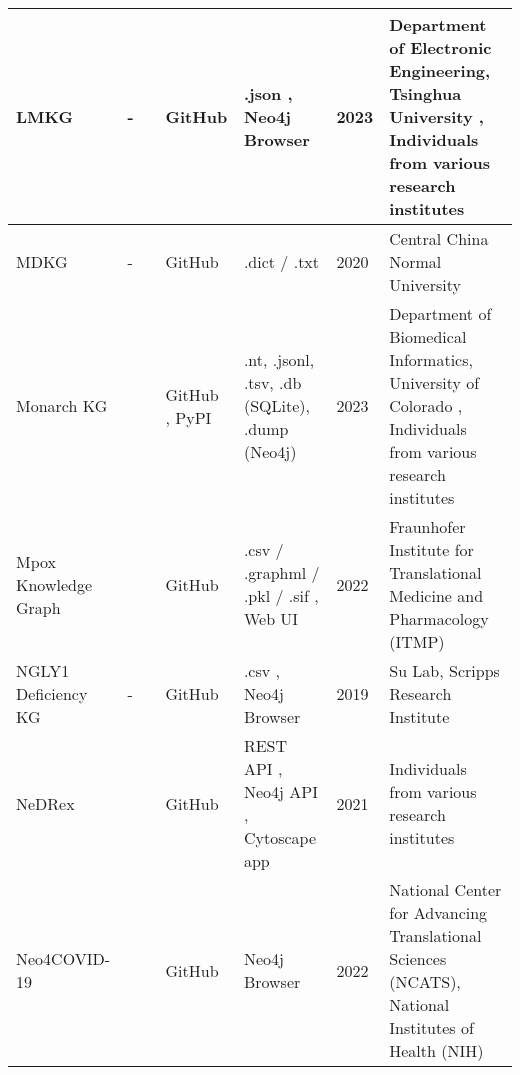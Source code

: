 \documentclass{article}
\begin{document}
\begin{landscape}
\begin{xltabular}{\textwidth}{p{3cm}|p{2.2cm}|p{2.2cm}|p{2.2cm}|p{2.2cm}|p{1cm}|p{6cm}}
\hline


LMKG
&
-
&
\cite{lmkg_publication}
&
GitHub
\cite{lmkg_github}
&
.json
\cite{lmkg_data1},
Neo4j Browser
\cite{lmkg_data2}
&
2023
&
Department of Electronic Engineering, Tsinghua University
\cite{lmkg_group},
Individuals from various research institutes
\\


\hline


MDKG
&
-
&
\cite{mdkg_publication}
&
GitHub
\cite{mdkg_github}
&
.dict / .txt
\cite{mdkg_data}
&
2020
&
Central China Normal University
\cite{mdkg_group}
\\


\hline


Monarch KG
&
\cite{monarchkg_website1}
\cite{monarchkg_website2}
&
\cite{monarchkg_publication1}
\cite{monarchkg_publication2}
\cite{monarchkg_publication3}
&
GitHub
\cite{monarchkg_github1}
\cite{monarchkg_github2},
PyPI
\cite{monarchkg_pypi}
&
.nt, .jsonl, .tsv, .db (SQLite), .dump (Neo4j)
\cite{monarchkg_data}
&
2023
&
Department of Biomedical Informatics, University of Colorado
\cite{monarchkg_group},
Individuals from various research institutes
\\


\hline


Mpox Knowledge Graph
&
\cite{mpoxkg_website}
&
\cite{mpoxkg_publication}
&
GitHub
\cite{mpoxkg_github}
&
.csv / .graphml / .pkl / .sif
\cite{mpoxkg_data1}
\cite{mpoxkg_data2},
Web UI
\cite{mpoxkg_data3}
&
2022
&
Fraunhofer Institute for Translational Medicine and Pharmacology (ITMP)
\cite{mpoxkg_group}
\\


\hline


NGLY1 Deficiency KG
&
-
&
\cite{ngly1dkg_publication}
&
GitHub
\cite{ngly1dkg_github1}
\cite{ngly1dkg_github2}
&
.csv
\cite{ngly1dkg_data1},
Neo4j Browser
\cite{ngly1dkg_data2}
&
2019
&
Su Lab, Scripps Research Institute
\cite{ngly1dkg_group}
\\


\hline


NeDRex
&
\cite{nedrex_website}
&
\cite{nedrex_publication}
&
GitHub
\cite{nedrex_github1}
\cite{nedrex_github2}
\cite{nedrex_github3}
&
REST API
\cite{nedrex_data1},
Neo4j API
\cite{nedrex_data2},
Cytoscape app
\cite{nedrex_cytoscape}
&
2021
&
Individuals from various research institutes
\\


\hline


Neo4COVID-19
&
\cite{neo4covid19_website}
&
\cite{neo4covid19_publication}
&
GitHub
\cite{neo4covid19_github}
&
Neo4j Browser
\cite{neo4covid19_data}
&
2022
&
National Center for Advancing Translational Sciences (NCATS), National Institutes of Health (NIH)
\cite{neo4covid19_group}
\\



\end{xltabular}
\end{landscape}
\end{document}
